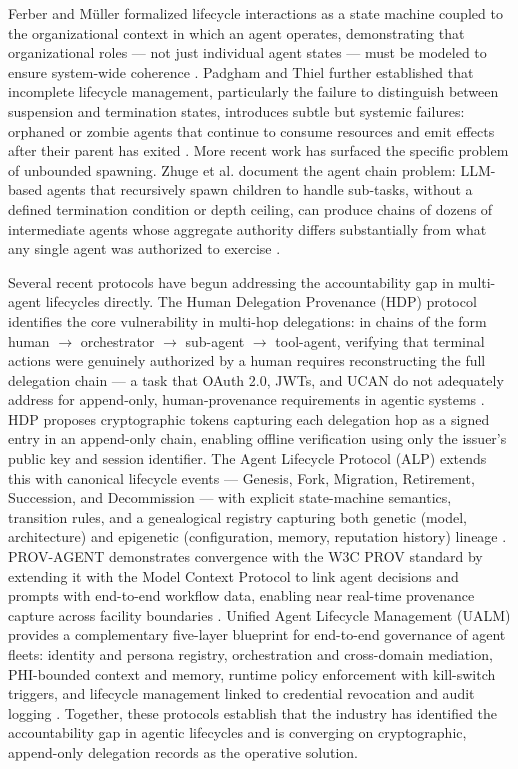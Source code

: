 Ferber and Müller formalized lifecycle interactions as a state machine coupled to the organizational context in which an agent operates, demonstrating that organizational roles --- not just individual agent states --- must be modeled to ensure system-wide coherence \cite{ferber1996}. Padgham and Thiel further established that incomplete lifecycle management, particularly the failure to distinguish between suspension and termination states, introduces subtle but systemic failures: orphaned or zombie agents that continue to consume resources and emit effects after their parent has exited \cite{padgham2001}. More recent work has surfaced the specific problem of unbounded spawning. Zhuge et al. document the agent chain problem: LLM-based agents that recursively spawn children to handle sub-tasks, without a defined termination condition or depth ceiling, can produce chains of dozens of intermediate agents whose aggregate authority differs substantially from what any single agent was authorized to exercise \cite{zhuge2024}.

Several recent protocols have begun addressing the accountability gap in multi-agent lifecycles directly. The Human Delegation Provenance (HDP) protocol identifies the core vulnerability in multi-hop delegations: in chains of the form human $\rightarrow$ orchestrator $\rightarrow$ sub-agent $\rightarrow$ tool-agent, verifying that terminal actions were genuinely authorized by a human requires reconstructing the full delegation chain --- a task that OAuth 2.0, JWTs, and UCAN do not adequately address for append-only, human-provenance requirements in agentic systems \cite{hdp-draft,hdp-draft-2}. HDP proposes cryptographic tokens capturing each delegation hop as a signed entry in an append-only chain, enabling offline verification using only the issuer's public key and session identifier. The Agent Lifecycle Protocol (ALP) extends this with canonical lifecycle events --- Genesis, Fork, Migration, Retirement, Succession, and Decommission --- with explicit state-machine semantics, transition rules, and a genealogical registry capturing both genetic (model, architecture) and epigenetic (configuration, memory, reputation history) lineage \cite{alp2025}. PROV-AGENT demonstrates convergence with the W3C PROV standard by extending it with the Model Context Protocol to link agent decisions and prompts with end-to-end workflow data, enabling near real-time provenance capture across facility boundaries \cite{prov-agent2025}. Unified Agent Lifecycle Management (UALM) provides a complementary five-layer blueprint for end-to-end governance of agent fleets: identity and persona registry, orchestration and cross-domain mediation, PHI-bounded context and memory, runtime policy enforcement with kill-switch triggers, and lifecycle management linked to credential revocation and audit logging \cite{ualm2025}. Together, these protocols establish that the industry has identified the accountability gap in agentic lifecycles and is converging on cryptographic, append-only delegation records as the operative solution.


